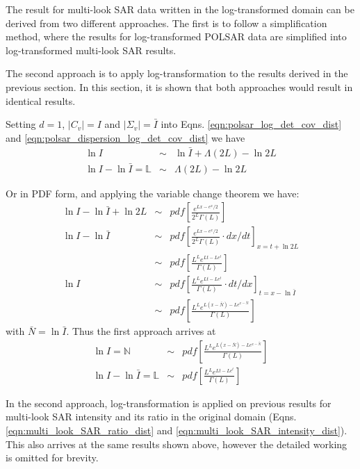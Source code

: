\documentclass[journal,12pt,draftcls,onecolumn]{IEEEtran}
\begin{document}
The result for multi-look SAR data written in the log-transformed domain can be derived from two different approaches.
The first is to follow a simplification method, where the results for log-transformed POLSAR data are simplified into log-transformed multi-look SAR results.

The second approach is to apply log-transformation to the results derived in the previous section. In this section, it is shown that both approaches would result in identical results.

Setting $d=1$, $|C_v|=I$ and $|\Sigma_v|=\bar{I}$ into Eqns. \ref{eqn:polsar_log_det_cov_dist} and \ref{eqn:polsar_dispersion_log_det_cov_dist}
we have
\begin{eqnarray*}
  \ln{I} &\sim& \ln{\bar{I}} + \Lambda(2L) - \ln{2L}  \\
  \ln{I} - \ln{\bar{I}} = \mathbb{L} &\sim& \Lambda(2L) - \ln{2L} 
\end{eqnarray*}

Or in PDF form, and applying the variable change theorem we have:
\begin{eqnarray*}
  \ln{I} - \ln{\bar{I}} + \ln{2L} &\sim& pdf \left[ \frac{e^{Lx-e^x/2}}{2^L \Gamma(L)} \right] \\
  \ln{I} - \ln{\bar{I}} &\sim& pdf \left[ \frac{e^{Lx-e^x/2}}{2^L \Gamma(L)} \cdot dx/dt \right]_{x=t+\ln{2L}} \\
   &\sim& pdf \left[ \frac{L^Le^{Lt-Le^t}}{ \Gamma(L)}  \right] \\
  \ln{I} &\sim&  pdf \left[ \frac{L^Le^{Lt-Le^t}}{ \Gamma(L)} \cdot dt/dx \right]_{t=x-\ln{\bar{I}}} \\
 &\sim&  pdf \left[ \frac{L^Le^{L(x-\bar{N})-Le^{x-\bar{N}}}}{ \Gamma(L)} \right] 
\end{eqnarray*}
with $\bar{N} = \ln{\bar{I}}$. Thus the first approach arrives at
\begin{eqnarray}
   \ln{I} = \mathbb{N} &\sim&  pdf \left[ \frac{L^Le^{L(x-\bar{N})-Le^{x-\bar{N}}}}{ \Gamma(L)} \right] \\
   \ln{I} - \ln{\bar{I}} = \mathbb{L} &\sim& pdf \left[ \frac{L^Le^{Lt-Le^t}}{ \Gamma(L)}  \right]  
\end{eqnarray}

In the second approach, log-transformation is applied on previous results for multi-look SAR intensity and its ratio in the original domain (Eqns. \ref{eqn:multi_look_SAR_ratio_dist} and \ref{eqn:multi_look_SAR_intensity_dist}).
This also arrives at the same results shown above, however the detailed working is omitted for brevity.
\end{document}
